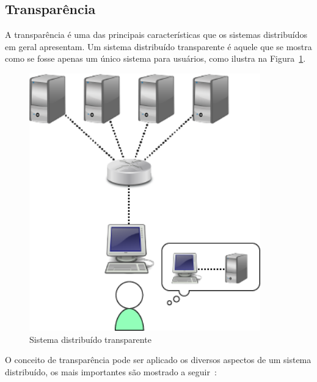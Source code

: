 	
	\subsection{Transparência}
	A transparência é uma das principais características que os sistemas distribuídos em geral apresentam. 
	Um sistema distribuído transparente é aquele que se mostra como se fosse apenas um único sistema para usuários, como ilustra na Figura~\ref{fig:transparente}. 
	\\

	\begin{figure}[htb]
		\begin{center}
			
			\includegraphics[clip,width=10.0cm]{images/sad.png}
			\caption{Sistema distribuído transparente}
			\label{fig:transparente}
		\end{center}
	\end{figure}
	
	
	O conceito de transparência pode ser aplicado os diversos aspectos de um sistema distribuído, os mais importantes são mostrado a seguir~\cite{tanenbaum07}:	


